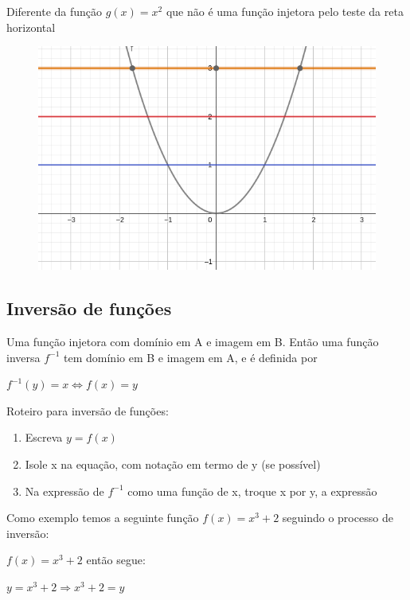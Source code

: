 \begin{multicols*}{2}
    Diferente da função $g(x) = x^2$ que não é uma função injetora pelo teste da reta horizontal

    \begin{figure}[H]
        \centering
        \includegraphics[scale=0.3]{assets/rafael/img38.png}
    \end{figure}

    \subsection*{Inversão de funções}
    \begin{theorem}
        Uma função injetora com domínio em A e imagem em B. Então uma função inversa $f^{-1}$ tem 				domínio em B e imagem em A, e é definida por

        $f^{-1}(y) = x \Leftrightarrow f(x) = y$
    \end{theorem}

    Roteiro para inversão de funções:

    \begin{enumerate}
        \item Escreva $y = f(x)$
        \item Isole x na equação, com notação em termo de y (se possível)
        \item Na expressão de $f^{-1}$ como uma função de x, troque x por y, a expressão
    \end{enumerate}

    Como exemplo temos a seguinte função  $f(x) = x^3 +2$ seguindo o processo de 					inversão:

    $f(x) =x^3+2$ então segue:

    $y = x^3 +2 \Rightarrow x^3 +2 = y $


\end{multicols*}
